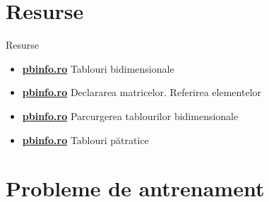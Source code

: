 \documentclass{beamer}
\begin{document}
\section{Resurse}

\begin{frame}{Resurse}
  \begin{itemize}\itemsep6pt
    \item \href{https://www.pbinfo.ro/articole/5620/tablouri-bidimensionale}{\textbf{pbinfo.ro}} \textemdash{} Tablouri bidimensionale
    \item \href{https://www.pbinfo.ro/articole/5622/declararea-matricelor-referirea-elementelor}{\textbf{pbinfo.ro}} \textemdash{} Declararea matricelor. Referirea elementelor
    \item \href{https://www.pbinfo.ro/articole/5623/parcurgerea-tablourilor-bidimensionale}{\textbf{pbinfo.ro}} \textemdash{} Parcurgerea tablourilor bidimensionale
    \item \href{https://www.pbinfo.ro/articole/5626/tablouri-patratice}{\textbf{pbinfo.ro}} \textemdash{} Tablouri pătratice
  \end{itemize}
\end{frame}

\section{Probleme de antrenament}
\end{document}
